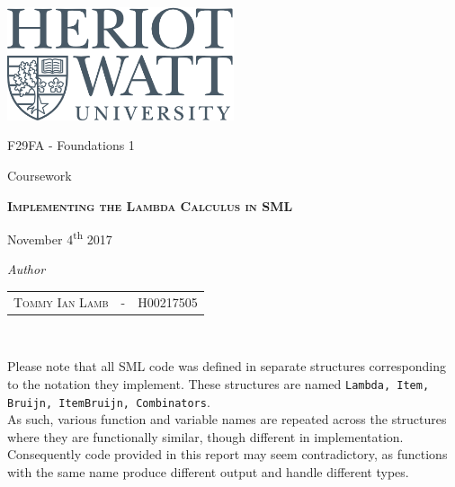\documentclass[11pt]{article}
\begin{document}
\begin{titlepage}
	\thispagestyle{empty}
	{\centering
		\includegraphics[width=0.5\textwidth]{heriot-watt-logo.png}\par\vspace{1cm}
		\vspace{1cm}
		{\LARGE F29FA - Foundations 1\par}
		{\LARGE Coursework\par}
		\vspace{1.5cm}
		\vspace{1.5cm}
		{\scshape\LARGE\bfseries Implementing the Lambda Calculus in SML \par}
		\vspace{5cm}
		\begin{center}
				November 4\textsuperscript{th} 2017
		\end{center}
		\vspace{1cm}
		\textit{Author}\par
		\begin{tabular}{rcl}
			\\
			\textsc{Tommy Ian Lamb} & - & H00217505 \\
		\end{tabular} \\
		

			
	}
\end{titlepage}


Please note that all SML code was defined in separate structures corresponding to the notation they implement. These structures are named \texttt{Lambda, Item, Bruijn, ItemBruijn, Combinators}. \\
As such, various function and variable names are repeated across the structures where they are functionally similar, though different in implementation. Consequently code provided in this report may seem contradictory, as functions with the same name produce different output and handle different types.
\end{document}
